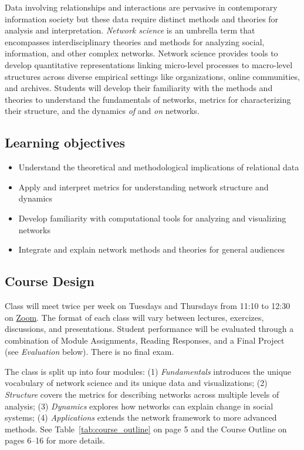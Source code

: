 \documentclass[11pt]{memoir}
\begin{document}
Data involving relationships and interactions are pervasive in contemporary information society but these data require distinct methods and theories for analysis and interpretation. \textit{Network science} is an umbrella term that encompasses interdisciplinary theories and methods for analyzing social, information, and other complex networks. Network science provides tools to develop quantitative representations linking micro-level processes to macro-level structures across diverse empirical settings like organizations, online communities, and archives. Students will develop their familiarity with the methods and theories to understand the fundamentals of networks, metrics for characterizing their structure, and the dynamics \textit{of} and \textit{on} networks.


\subsection{Learning objectives}

\begin{itemize}[itemsep=0em]
    \item Understand the theoretical and methodological implications of relational data 
    \item Apply and interpret metrics for understanding network structure and dynamics
    \item Develop familiarity with computational tools for analyzing and visualizing networks
    \item Integrate and explain network methods and theories for general audiences
\end{itemize}

\subsection{Course Design}
Class will meet twice per week on Tuesdays and Thursdays from 11:10 to 12:30 on \href{https://cuboulder.zoom.us/j/96935610716}{Zoom}. The format of each class will vary between lectures, exercizes, discussions, and presentations. Student performance will be evaluated through a combination of Module Assignments, Reading Responses, and a Final Project (see \textit{Evaluation} below). There is no final exam.

The class is split up into four modules: (1) \textit{Fundamentals} introduces the unique vocabulary of network science and its unique data and visualizations; (2) \textit{Structure} covers the metrics for describing networks across multiple levels of analysis; (3) \textit{Dynamics} explores how networks can explain change in social systems; (4) \textit{Applications} extends the network framework to more advanced methods. See Table~\ref{tab:course_outline} on page 5 and the Course Outline on pages 6--16 for more details.
\end{document}
